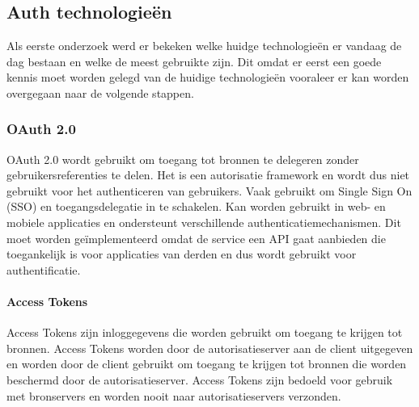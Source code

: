 \chapter{}%
\label{ch:stand-van-zaken}


\
\section{Auth technologieën}%
\label{sec:auth-technologieën}
Als eerste onderzoek werd er bekeken welke huidge technologieën er vandaag de dag bestaan en welke de meest gebruikte zijn. Dit omdat er eerst een goede kennis
moet worden gelegd van de huidige technologieën vooraleer er kan worden overgegaan naar de volgende stappen.


\subsection{OAuth 2.0}%
\label{subsec:oauth-2.0}
\autocite{Hardt2012}
OAuth 2.0 wordt gebruikt om toegang tot bronnen te delegeren zonder gebruikersreferenties te delen. Het is een autorisatie framework en wordt dus niet gebruikt voor het authenticeren van gebruikers. Vaak gebruikt om Single Sign On (SSO) en toegangsdelegatie in te schakelen. Kan worden gebruikt in web- en mobiele applicaties en ondersteunt verschillende authenticatiemechanismen.
Dit moet worden geïmplementeerd omdat de service een API gaat aanbieden die toegankelijk is voor applicaties van derden en dus wordt gebruikt voor authentificatie.

\subsubsection{Access Tokens}%
\label{subsubsec:access-tokens}
Access Tokens zijn inloggegevens die worden gebruikt om toegang te krijgen tot bronnen. Access Tokens worden door de autorisatieserver aan de client uitgegeven en worden door de client gebruikt om toegang te krijgen tot bronnen die worden beschermd door de autorisatieserver. Access Tokens zijn bedoeld voor gebruik met bronservers en worden nooit naar autorisatieservers verzonden.

